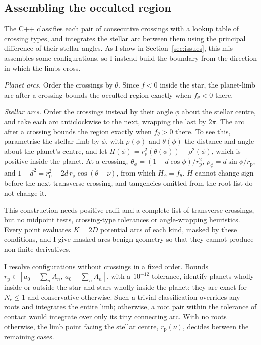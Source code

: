 \documentclass[twocolumn]{aastex701}
\begin{document}
\subsection{Assembling the occulted region} \label{sec:assembly}

The C++ classifies each pair of consecutive crossings with a lookup table
of crossing types, and integrates the stellar arc between them using the
principal difference of their stellar angles. As I show in
Section~\ref{sec:issues}, this mis-assembles some configurations, so I
instead build the boundary from the direction in which the limbs cross.

\textit{Planet arcs.} Order the crossings by $\theta$. Since $f<0$
inside the star, the planet-limb arc after a crossing bounds the occulted
region exactly when $f_\theta<0$ there.

\textit{Stellar arcs.} Order the crossings instead by their angle $\phi$
about the stellar centre, and take each arc anticlockwise to the next,
wrapping the last by $2\pi$. The arc after a crossing bounds the region
exactly when $f_\theta > 0$ there. To see this, parametrise the stellar
limb by $\phi$, with $\rho(\phi)$ and $\theta(\phi)$ the distance and
angle about the planet's centre, and let
$H(\phi) = r_\mathrm{p}^2(\theta(\phi)) - \rho^2(\phi)$, which is positive
inside the planet. At a crossing, $\theta_\phi = (1-d\cos\phi)/r_\mathrm{p}^2$,
$\rho_\phi = d\sin\phi/r_\mathrm{p}$, and
$1-d^2 = r_\mathrm{p}^2-2d\,r_\mathrm{p}\cos(\theta-\nu)$, from which
$H_\phi = f_\theta$. $H$ cannot change sign before the next transverse
crossing, and tangencies omitted from the root list do not change it.

This construction needs positive radii and a complete list of transverse
crossings, but no midpoint tests, crossing-type tolerances or
angle-wrapping heuristics. Every point evaluates $K=2D$ potential arcs of
each kind, masked by these conditions, and I give masked arcs benign
geometry so that they cannot produce non-finite derivatives.

I resolve configurations without crossings in a fixed order. Bounds
$r_\mathrm{p}\in[a_0 - \sum_n A_n,\, a_0 + \sum_n A_n]$, with a $10^{-12}$
tolerance, identify planets wholly inside or outside the star and stars
wholly inside the planet; they are exact for $N_c\leq1$ and conservative
otherwise. Such a trivial classification overrides any roots and
integrates the entire limb; otherwise, a root pair within the tolerance of
contact would integrate over only its tiny connecting arc. With no roots otherwise, the limb point facing the stellar centre,
$r_\mathrm{p}(\nu)$, decides between the remaining cases.
\end{document}
